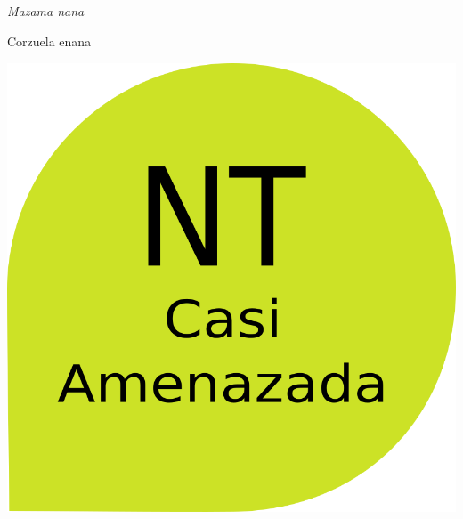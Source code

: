 \documentclass[
  x11names]{article}
\title{~}
\author{}
\date{\vspace{-2.5em}}
\begin{document}
\maketitle

\renewenvironment{framed}[1][\hsize]
  {\MakeFramed{\hsize#1\advance\hsize-\width \FrameRestore}}%
  {\endMakeFramed}

\setmainfont{Arial}
\setsansfont{Arial}
\setmonofont{Arial}

\newcommand\invisiblesection[1]{%
  \refstepcounter{section}%
  \addcontentsline{toc}{section}{\protect\numberline{\thesection}#1}%
  \sectionmark{#1}}


%

\vspace{-3cm}

\begin{minipage}{0.7\textwidth}
\vspace{0.15cm}
{\fontsize{18}{22}\selectfont\textit{Mazama nana}}

\vspace{0.3cm}
{\fontsize{30}{36}\selectfont Corzuela enana}
\end{minipage}
\hspace{0.05\textwidth}
\begin{minipage}{0.20\textwidth}
\includegraphics[width=\textwidth]{images/nt.png}\\
\end{minipage}
\end{document}
